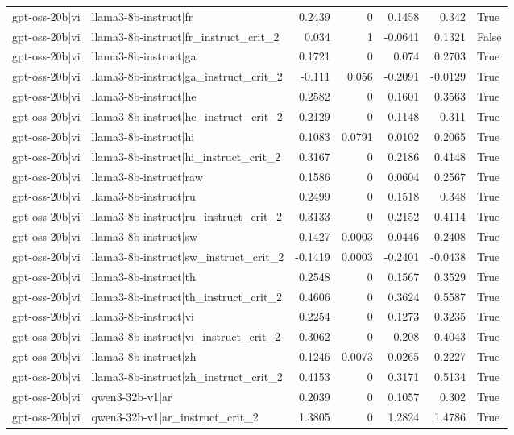 \begin{table}
\begin{tabular}{l l r r r r l}
gpt-oss-20b|vi & llama3-8b-instruct|fr & 0.2439 & 0 & 0.1458 & 0.342 & True \\
gpt-oss-20b|vi & llama3-8b-instruct|fr_instruct_crit_2 & 0.034 & 1 & -0.0641 & 0.1321 & False \\
gpt-oss-20b|vi & llama3-8b-instruct|ga & 0.1721 & 0 & 0.074 & 0.2703 & True \\
gpt-oss-20b|vi & llama3-8b-instruct|ga_instruct_crit_2 & -0.111 & 0.056 & -0.2091 & -0.0129 & True \\
gpt-oss-20b|vi & llama3-8b-instruct|he & 0.2582 & 0 & 0.1601 & 0.3563 & True \\
gpt-oss-20b|vi & llama3-8b-instruct|he_instruct_crit_2 & 0.2129 & 0 & 0.1148 & 0.311 & True \\
gpt-oss-20b|vi & llama3-8b-instruct|hi & 0.1083 & 0.0791 & 0.0102 & 0.2065 & True \\
gpt-oss-20b|vi & llama3-8b-instruct|hi_instruct_crit_2 & 0.3167 & 0 & 0.2186 & 0.4148 & True \\
gpt-oss-20b|vi & llama3-8b-instruct|raw & 0.1586 & 0 & 0.0604 & 0.2567 & True \\
gpt-oss-20b|vi & llama3-8b-instruct|ru & 0.2499 & 0 & 0.1518 & 0.348 & True \\
gpt-oss-20b|vi & llama3-8b-instruct|ru_instruct_crit_2 & 0.3133 & 0 & 0.2152 & 0.4114 & True \\
gpt-oss-20b|vi & llama3-8b-instruct|sw & 0.1427 & 0.0003 & 0.0446 & 0.2408 & True \\
gpt-oss-20b|vi & llama3-8b-instruct|sw_instruct_crit_2 & -0.1419 & 0.0003 & -0.2401 & -0.0438 & True \\
gpt-oss-20b|vi & llama3-8b-instruct|th & 0.2548 & 0 & 0.1567 & 0.3529 & True \\
gpt-oss-20b|vi & llama3-8b-instruct|th_instruct_crit_2 & 0.4606 & 0 & 0.3624 & 0.5587 & True \\
gpt-oss-20b|vi & llama3-8b-instruct|vi & 0.2254 & 0 & 0.1273 & 0.3235 & True \\
gpt-oss-20b|vi & llama3-8b-instruct|vi_instruct_crit_2 & 0.3062 & 0 & 0.208 & 0.4043 & True \\
gpt-oss-20b|vi & llama3-8b-instruct|zh & 0.1246 & 0.0073 & 0.0265 & 0.2227 & True \\
gpt-oss-20b|vi & llama3-8b-instruct|zh_instruct_crit_2 & 0.4153 & 0 & 0.3171 & 0.5134 & True \\
gpt-oss-20b|vi & qwen3-32b-v1|ar & 0.2039 & 0 & 0.1057 & 0.302 & True \\
gpt-oss-20b|vi & qwen3-32b-v1|ar_instruct_crit_2 & 1.3805 & 0 & 1.2824 & 1.4786 & True \\

\end{tabular}
\end{table}
